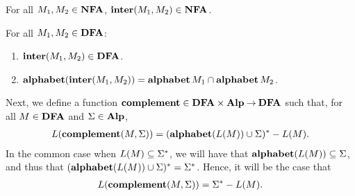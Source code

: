%
%
\begin{proposition}
For all $M_1,M_2\in\mathbf{NFA}$, $\mathbf{inter}(M_1,M_2)\in\mathbf{NFA}$.
\end{proposition}

%
%
\begin{proposition}
For all $M_1,M_2\in\mathbf{DFA}$:
\begin{enumerate}[\quad(1)]
\item $\mathbf{inter}(M_1,M_2)\in\mathbf{DFA}$.

\item $\mathbf{alphabet}(\mathbf{inter}(M_1,M_2)) = \mathbf{alphabet}\,M_1\cap\mathbf{alphabet}\,M_2$.
\end{enumerate}
\end{proposition}

%
%
Next, we define a function $\mathbf{complement}\in\mathbf{DFA}\times\mathbf{Alp}\mathbin{\to}\mathbf{DFA}$
such that, for all $M\in\mathbf{DFA}$ and $\Sigma\in\mathbf{Alp}$,
\begin{gather*}
L(\mathbf{complement}(M,\Sigma)) = (\mathbf{alphabet}(L(M))\cup\Sigma)^*-L(M) .
\end{gather*}
In the common case when $L(M)\subseteq\Sigma^*$, we will have that
$\mathbf{alphabet}(L(M))\subseteq\Sigma$, and thus that
$(\mathbf{alphabet}(L(M))\cup\Sigma)^*=\Sigma^*$.  Hence, it will be the case
that
\begin{gather*}
L(\mathbf{complement}(M,\Sigma)) = \Sigma^*-L(M) .
\end{gather*}

